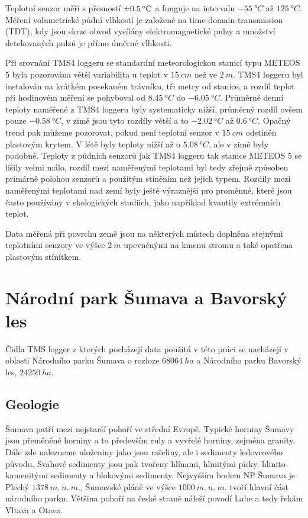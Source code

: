 Teplotní senzor měří s přesností $\SI{\pm 0.5}{\degree C}$ a funguje na intervalu $\SI{-55}{\degree C}$ až $\SI{125}{\degree C}$. Měření volumetrické půdní vlhkostí je založené na time-domain-transmission (TDT), kdy jsou skrze obvod vysílány elektromagnetické pulzy a množství detekovaných pulzů je přímo úměrné vlhkosti. 

Při srovnání TMS4 loggeru se standardní meteorologickou stanicí typu METEOS 5 byla pozorována větší variabilita u teplot v $\SI{15}{cm}$ než ve $\SI{2}{m}$. TMS4 loggeru byl instalován na krátkém posekaném trávníku, tři metry od stanice, a rozdíl teplot při hodinovém měření se pohyboval od $\SI{+8.45}{\degree C}$ do $\SI{-6.05}{\degree C}$. Průměrné denní teploty naměřené z TMS4 loggeru byly systematicky nižší, průměrný rozdíl ovšem pouze $\SI{-0.58}{\degree C}$, v zimě jsou tyto rozdíly větší a to $\SI{-2.02}{\degree C}$ až $\SI{0.6}{\degree C}$. Opačný trend pak můžeme pozorovat, pokud není teplotní senzor v $\SI{15}{cm}$ odstíněn plastovým krytem. V létě byly teploty nižší až o $\SI{5.08}{\degree C}$, ale v zimě byly podobné. Teploty z půdních senzorů jak TMS4 loggeru tak stanice METEOS 5 se lišily velmi málo, rozdíl mezi naměřenými teplotami byl tedy zřejmě způsoben primárně polohou senzorů a použitým stíněním než jejich typem. Rozdíly mezi naměřenými teplotami nad zemí byly ještě výraznější pro proměnné, které jsou často používány v ekologických studiích, jako například kvantily extrémních teplot\cite{WildJan2019Caer}. 

Data měřená při povrchu země jsou na některých místech doplněna stejnými teplotními senzory ve výšce $\SI{2}{m}$ upevněnými na kmenu stromu a také opatřena plastovým stínítkem.

\section{Národní park Šumava a Bavorský les} \label{chap:sumavabavorskyles}
Čidla TMS logger z kterých pocházejí data použitá v této práci se nacházejí v oblasti Národního parku Šumava o rozloze $\SI{68 064}{ha}$\cite{npsumava} a Národního parku Bavorský les, $\SI{24 250}{ha}$.

\subsection{Geologie}
Šumava patří mezi nejstarší pohoří ve střední Evropě\cite{WildJan2004Cops}. Typické horniny Šumavy jsou přeměněné horniny a to především ruly a vyvřelé horniny, zejména granity. Dále zde nalezneme uloženiny jako jsou rašeliny, ale i sedimenty ledovcového původu. Svahové sedimenty jsou pak tvořeny hlínami, hlinitými písky, hlinito-kamenitými sedimenty a blokovými sedimenty. Nejvyšším bodem NP Šumava je Plechý $\SI{1378}{m.\ n.\ m.}$, Šumavské pláně ve výšce $\SI{1000}{m.\ n.\ m.}$ tvoří hlavní část národního parku\cite{npsumava}. Většina pohoří na české straně náleží povodí Labe a tedy řekám Vltava a Otava.

